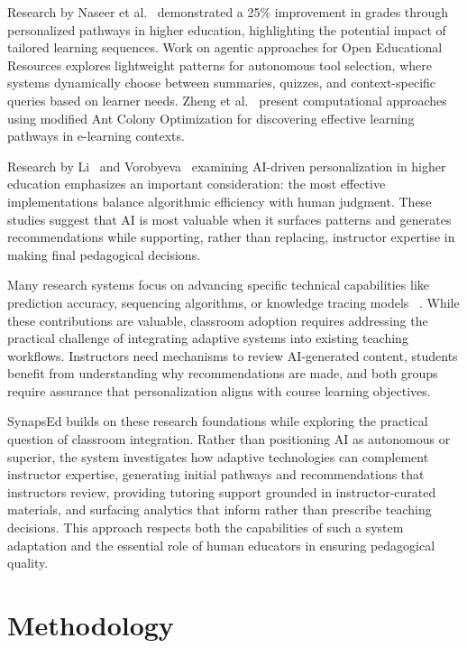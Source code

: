 \documentclass{stylefiles/capstone}
\begin{document}
Research by Naseer et al.~\cite{NaseerFawad2024Idlt} demonstrated a 25\% improvement in grades through personalized pathways in higher education, highlighting the potential impact of tailored learning sequences. Work on agentic approaches for Open Educational Resources explores lightweight patterns for autonomous tool selection, where systems dynamically choose between summaries, quizzes, and context-specific queries based on learner needs. Zheng et al.~\cite{10933562} present computational approaches using modified Ant Colony Optimization for discovering effective learning pathways in e-learning contexts.

Research by Li~\cite{Li} and Vorobyeva~\cite{Vorobyeva2025} examining AI-driven personalization in higher education emphasizes an important consideration: the most effective implementations balance algorithmic efficiency with human judgment. These studies suggest that AI is most valuable when it surfaces patterns and generates recommendations while supporting, rather than replacing, instructor expertise in making final pedagogical decisions.

Many research systems focus on advancing specific technical capabilities like prediction accuracy, sequencing algorithms, or knowledge tracing models ~\cite{zhang2024questioncentricmultiexpertscontrastivelearning}. While these contributions are valuable, classroom adoption requires addressing the practical challenge of integrating adaptive systems into existing teaching workflows. Instructors need mechanisms to review AI-generated content, students benefit from understanding why recommendations are made, and both groups require assurance that personalization aligns with course learning objectives.

SynapsEd builds on these research foundations while exploring the practical question of classroom integration. Rather than positioning AI as autonomous or superior, the system investigates how adaptive technologies can complement instructor expertise, generating initial pathways and recommendations that instructors review, providing tutoring support grounded in instructor-curated materials, and surfacing analytics that inform rather than prescribe teaching decisions. This approach respects both the capabilities of such a system adaptation and the essential role of human educators in ensuring pedagogical quality.


\section{Methodology}
\end{document}
